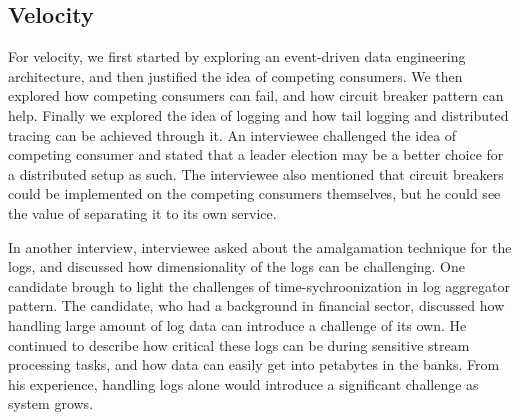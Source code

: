 \documentclass[a4paper,11pt,article,oneside]{memoir}
\begin{document}



\subsection{Velocity}

For velocity, we first started by exploring an event-driven data engineering architecture, and then justified the idea of competing consumers. We then explored how competing consumers can fail, and how circuit breaker pattern can help. Finally we explored the idea of logging and how tail logging and distributed tracing can be achieved through it. An interviewee challenged the idea of competing consumer and stated that a leader election may be a better choice for a distributed setup as such. The interviewee also mentioned that circuit breakers could be implemented on the competing consumers themselves, but he could see the value of separating it to its own service.  

In another interview, interviewee asked about the amalgamation technique for the logs, and discussed how dimensionality of the logs can be challenging. One candidate brough to light the challenges of time-sychroonization in log aggregator pattern. The candidate, who had a background in financial sector, discussed how handling large amount of log data can introduce a challenge of its own. He continued to describe how critical these logs can be during sensitive stream processing tasks, and how data can easily get into petabytes in the banks. From his experience, handling logs alone would introduce a significant challenge as system grows.




\end{document}
